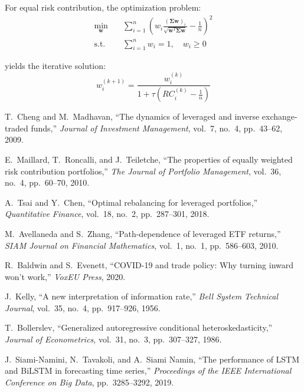 \documentclass[onecolumn,11pt]{IEEEtran}
\begin{document}
For equal risk contribution, the optimization problem:
\begin{align}
\min_{\mathbf{w}} &\quad \sum_{i=1}^n \left( w_i \frac{(\boldsymbol{\Sigma}\mathbf{w})_i}{\sqrt{\mathbf{w}^T\boldsymbol{\Sigma}\mathbf{w}}} - \frac{1}{n} \right)^2 \\
\text{s.t.} &\quad \sum_{i=1}^n w_i = 1, \quad w_i \geq 0
\end{align}

yields the iterative solution:
\begin{equation}
w_i^{(k+1)} = \frac{w_i^{(k)}}{1 + \tau \left( RC_i^{(k)} - \frac{1}{n} \right)}
\end{equation}

\begin{thebibliography}{12}

T.~Cheng and M.~Madhavan,
``The dynamics of leveraged and inverse exchange-traded funds,''
\emph{Journal of Investment Management}, vol.~7, no.~4, pp.~43--62, 2009.

E.~Maillard, T.~Roncalli, and J.~Teiletche,
``The properties of equally weighted risk contribution portfolios,''
\emph{The Journal of Portfolio Management}, vol.~36, no.~4, pp.~60--70, 2010.

A.~Tsai and Y.~Chen,
``Optimal rebalancing for leveraged portfolios,''
\emph{Quantitative Finance}, vol.~18, no.~2, pp.~287--301, 2018.

M.~Avellaneda and S.~Zhang,
``Path-dependence of leveraged ETF returns,''
\emph{SIAM Journal on Financial Mathematics}, vol.~1, no.~1, pp.~586--603, 2010.

R.~Baldwin and S.~Evenett,
``COVID-19 and trade policy: Why turning inward won't work,''
\emph{VoxEU Press}, 2020.

J.~Kelly,
``A new interpretation of information rate,''
\emph{Bell System Technical Journal}, vol.~35, no.~4, pp.~917--926, 1956.

T.~Bollerslev,
``Generalized autoregressive conditional heteroskedasticity,''
\emph{Journal of Econometrics}, vol.~31, no.~3, pp.~307--327, 1986.

J.~Siami-Namini, N.~Tavakoli, and A.~Siami Namin,
``The performance of LSTM and BiLSTM in forecasting time series,''
\emph{Proceedings of the IEEE International Conference on Big Data}, pp.~3285--3292, 2019.


\end{thebibliography}
\end{document}

